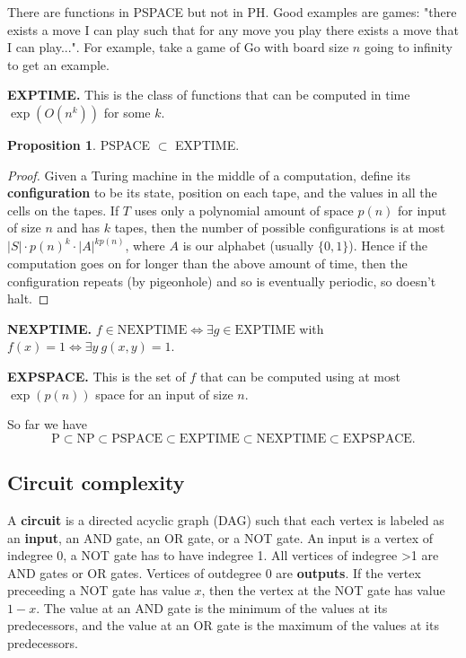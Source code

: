 \documentclass{article}
\theoremstyle{definition}
\newtheorem{prop}[theorem]{Proposition}
\begin{document}
There are functions in PSPACE but not in PH. Good examples are games: "there exists a move I can play such that for any move you play there exists a move that I can play...". For example, take a game of Go with board size $n$ going to infinity to get an example.
\vspace{1mm}
 
\textbf{EXPTIME.} This is the class of functions that can be computed in time $\exp(O(n^k))$ for some $k$.


\begin{prop}
    PSPACE $\subset $ EXPTIME.
\end{prop}
\begin{proof}
    Given a Turing machine in the middle of a computation, define its \textbf{configuration} to be its state, position on each tape, and the values in all the cells on the tapes. If $T$ uses only a polynomial amount of space $p(n)$ for input of size $n$ and has $k$ tapes, then the number of possible configurations is at most $|S|\cdot p(n)^k\cdot |A|^{k p(n)}$, where $A$ is our alphabet (usually $\{0,1\}$). Hence if the computation goes on for longer than the above amount of time, then the configuration repeats (by pigeonhole) and so is eventually periodic, so doesn't halt.
\end{proof}
\textbf{NEXPTIME.} $f \in \text{NEXPTIME} \iff \exists g \in \text{EXPTIME}$ with $f(x)=1 \iff \exists y~ g(x,y) = 1$.
\vspace{1mm}
 
\textbf{EXPSPACE.} This is the set of $f$ that can be computed using at most $\exp(p(n))$ space for an input of size $n$.
\vspace{1mm}
 
So far we have $$\text{P} \subset \text{NP} \subset \text{PSPACE} \subset \text{EXPTIME} \subset \text{NEXPTIME} \subset \text{EXPSPACE}.$$

\subsection{Circuit complexity}

A \textbf{circuit} is a directed acyclic graph (DAG) such that each vertex is labeled as an \textbf{input}, an AND gate, an OR gate, or a NOT gate. An input is a vertex of indegree 0, a NOT gate has to have indegree 1. All vertices of indegree >1 are AND gates or OR gates. Vertices of outdegree 0 are \textbf{outputs}. If the vertex preceeding a NOT gate has value $x$, then the vertex at the NOT gate has value $1-x$. The value at an AND gate is the minimum of the values at its predecessors, and the value at an OR gate is the maximum of the values at its predecessors.
\vspace{1mm}
 
\end{document}

